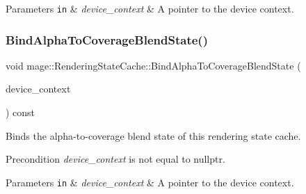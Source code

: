 \begin{DoxyParams}[1]{Parameters}
\mbox{\tt in}  & {\em device\+\_\+context} & A pointer to the device context. \\
\hline
\end{DoxyParams}
\hypertarget{structmage_1_1_rendering_state_cache_af878b3d078b3ee61ca3a5ca713e65672}{}\label{structmage_1_1_rendering_state_cache_af878b3d078b3ee61ca3a5ca713e65672} 
\subsubsection{\texorpdfstring{Bind\+Alpha\+To\+Coverage\+Blend\+State()}{BindAlphaToCoverageBlendState()}}
{\footnotesize\ttfamily void mage\+::\+Rendering\+State\+Cache\+::\+Bind\+Alpha\+To\+Coverage\+Blend\+State (\begin{DoxyParamCaption}\item[{I\+D3\+D11\+Device\+Context2 $\ast$}]{device\+\_\+context }\end{DoxyParamCaption}) const\hspace{0.3cm}{\ttfamily [noexcept]}}

Binds the alpha-\/to-\/coverage blend state of this rendering state cache.

\begin{DoxyPrecond}{Precondition}
{\itshape device\+\_\+context} is not equal to {\ttfamily nullptr}. 
\end{DoxyPrecond}

\begin{DoxyParams}[1]{Parameters}
\mbox{\tt in}  & {\em device\+\_\+context} & A pointer to the device context. \\
\hline
\end{DoxyParams}
\hypertarget{structmage_1_1_rendering_state_cache_af5f4291ceaf2df6c0b76667e228cf173}{}\label{structmage_1_1_rendering_state_cache_af5f4291ceaf2df6c0b76667e228cf173} 
